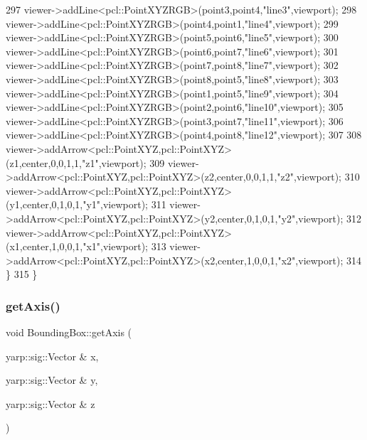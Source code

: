 \begin{DoxyCode}
297         viewer->addLine<pcl::PointXYZRGB>(point3,point4,\textcolor{stringliteral}{"line3"},viewport);
298         viewer->addLine<pcl::PointXYZRGB>(point4,point1,\textcolor{stringliteral}{"line4"},viewport);
299         viewer->addLine<pcl::PointXYZRGB>(point5,point6,\textcolor{stringliteral}{"line5"},viewport);
300         viewer->addLine<pcl::PointXYZRGB>(point6,point7,\textcolor{stringliteral}{"line6"},viewport);
301         viewer->addLine<pcl::PointXYZRGB>(point7,point8,\textcolor{stringliteral}{"line7"},viewport);
302         viewer->addLine<pcl::PointXYZRGB>(point8,point5,\textcolor{stringliteral}{"line8"},viewport);
303         viewer->addLine<pcl::PointXYZRGB>(point1,point5,\textcolor{stringliteral}{"line9"},viewport);
304         viewer->addLine<pcl::PointXYZRGB>(point2,point6,\textcolor{stringliteral}{"line10"},viewport);
305         viewer->addLine<pcl::PointXYZRGB>(point3,point7,\textcolor{stringliteral}{"line11"},viewport);
306         viewer->addLine<pcl::PointXYZRGB>(point4,point8,\textcolor{stringliteral}{"line12"},viewport);
307         
308         viewer->addArrow<pcl::PointXYZ,pcl::PointXYZ>(z1,center,0,0,1,1,\textcolor{stringliteral}{"z1"},viewport);
309         viewer->addArrow<pcl::PointXYZ,pcl::PointXYZ>(z2,center,0,0,1,1,\textcolor{stringliteral}{"z2"},viewport);
310         viewer->addArrow<pcl::PointXYZ,pcl::PointXYZ>(y1,center,0,1,0,1,\textcolor{stringliteral}{"y1"},viewport);
311         viewer->addArrow<pcl::PointXYZ,pcl::PointXYZ>(y2,center,0,1,0,1,\textcolor{stringliteral}{"y2"},viewport);
312         viewer->addArrow<pcl::PointXYZ,pcl::PointXYZ>(x1,center,1,0,0,1,\textcolor{stringliteral}{"x1"},viewport);
313         viewer->addArrow<pcl::PointXYZ,pcl::PointXYZ>(x2,center,1,0,0,1,\textcolor{stringliteral}{"x2"},viewport);
314     \}
315 \}
\end{DoxyCode}
\label{classiCub_1_1data3D_1_1BoundingBox_a768e10207aef845d49e9788809b5f69f} 
\subsubsection{\texorpdfstring{get\+Axis()}{getAxis()}}
{\footnotesize\ttfamily void Bounding\+Box\+::get\+Axis (\begin{DoxyParamCaption}\item[{yarp\+::sig\+::\+Vector \&}]{x,  }\item[{yarp\+::sig\+::\+Vector \&}]{y,  }\item[{yarp\+::sig\+::\+Vector \&}]{z }\end{DoxyParamCaption})}



